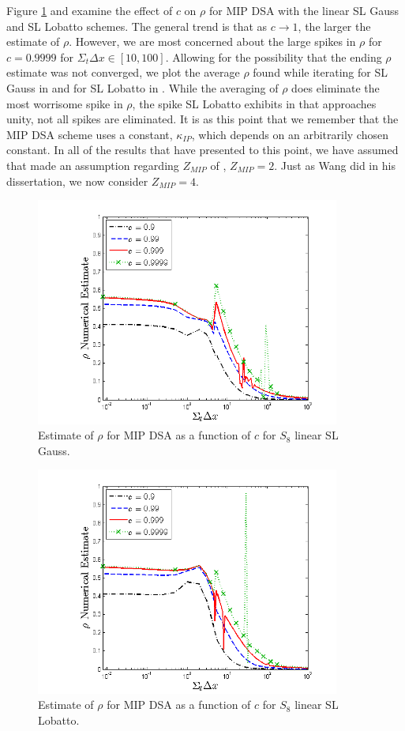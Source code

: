 Figure \ref{fig:mip_gauss_as_fun_c} and  examine the effect of $c$ on $\rho$ for MIP DSA with the linear SL Gauss and SL Lobatto schemes.
The general trend is that as $c\to 1$, the larger the estimate of $\rho$.
However, we are most concerned about the large spikes in $\rho$ for $c=0.9999$ for $\Sigma_t \Delta x \in [10,100]$.
Allowing for the possibility that the ending $\rho$ estimate was not converged, we plot the average $\rho$ found while iterating for SL Gauss in  and for SL Lobatto in .
While the averaging of $\rho$ does eliminate the most worrisome spike in $\rho$, the spike SL Lobatto exhibits in  that approaches unity, not all spikes are  eliminated.  
It is as this point that we remember that the MIP DSA scheme uses a constant, $\kappa_{IP}$, which depends on an arbitrarily chosen constant.  In all of the results that have presented to this point, we have assumed that made an assumption regarding $Z_{MIP}$ of , $Z_{MIP} =2$.
Just as Wang did in his dissertation\cite{yaqi_dissertation}, we now consider $Z_{MIP}=4$.  
\newpage
\begin{figure}[!htp]
\centering
\includegraphics[width=10cm]{chapter4_acceleration/Const_2_Constant_XS_c_comparions_MIP_Gauss.png}
\caption{Estimate of $\rho$ for MIP DSA as a function of $c$  for  $S_8$  linear SL Gauss.}
\label{fig:mip_gauss_as_fun_c}
\end{figure}
%
%
\begin{figure}[!hbp]
\centering
\includegraphics[width=10cm]{chapter4_acceleration/Const_2_Constant_XS_c_comparions_MIP_Lobatto.png}
\caption{Estimate of $\rho$ for MIP DSA as a function of $c$  for  $S_8$  linear SL Lobatto.}
\label{fig:mip_lobatto_as_fun_c}
\end{figure}
